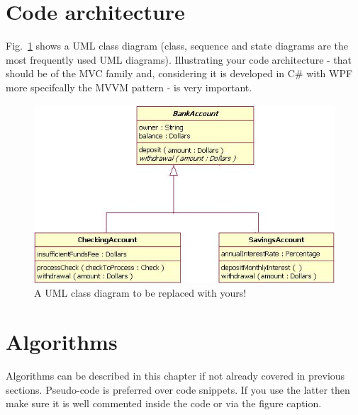 \documentclass[a4paper, oneside, 11pt]{report}
\begin{document}
    \section{Code architecture}

    Fig.\ \ref{class} shows a UML class diagram (class, sequence and state diagrams are the most frequently used UML diagrams). Illustrating your code architecture - that should be of the MVC family and, considering it is developed in C\# with WPF more specifcally the MVVM pattern - is very important.

    \begin{figure}[htb]
        \includegraphics[width=1.0 \columnwidth]{class.png}
        \caption{A UML class diagram to be replaced with yours!}
        \label{class}
    \end{figure}

    \section{Algorithms}

    Algorithms can be described in this chapter if not already covered in previous sections. Pseudo-code is preferred over code snippets. If you use the latter then make sure it is well commented inside the code or via the figure caption.

\end{document}

